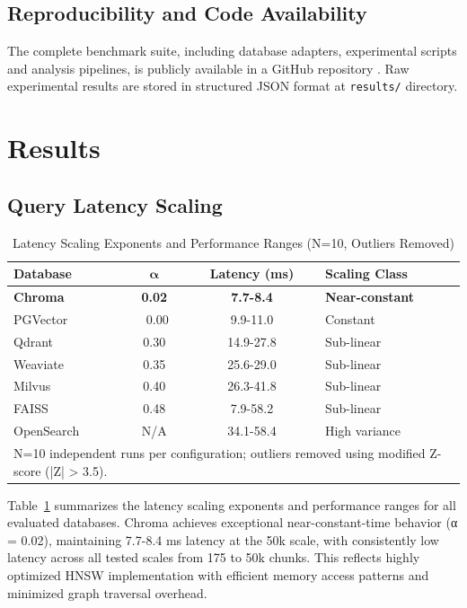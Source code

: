 \documentclass{article}
\begin{document}
\subsection{Reproducibility and Code Availability}
The complete benchmark suite, including database adapters, experimental scripts and analysis pipelines, is publicly available in a GitHub repository \cite{kwaai2025benchmark}. Raw experimental results are stored in structured JSON format at \texttt{results/} directory.


\section{Results}
\label{sec: results}

\subsection{Query Latency Scaling}
\begin{table}[h]
\small
\centering
\caption{Latency Scaling Exponents and Performance Ranges (N=10, Outliers Removed)}
\begin{tabular}{lccl}
\toprule
\textbf{Database} & $\boldsymbol{\alpha}$ & \textbf{Latency (ms)} & \textbf{Scaling Class} \\
\midrule
\textbf{Chroma} & \textbf{0.02} & \textbf{7.7-8.4} & \textbf{Near-constant} \\
PGVector & ~0.00 & 9.9-11.0 & Constant \\
Qdrant & 0.30 & 14.9-27.8 & Sub-linear \\
Weaviate & 0.35 & 25.6-29.0 & Sub-linear \\
Milvus & 0.40 & 26.3-41.8 & Sub-linear \\
FAISS & 0.48 & 7.9-58.2 & Sub-linear \\
OpenSearch & N/A & 34.1-58.4 & High variance \\
\bottomrule
\multicolumn{4}{l}{\small *N=10 independent runs per configuration; outliers removed using modified Z-score (|Z| > 3.5).}
\end{tabular}
\label{tab:latency}
\end{table}

Table~\ref{tab:latency} summarizes the latency scaling exponents and performance ranges for all evaluated databases. Chroma achieves exceptional near-constant-time behavior (α = 0.02), maintaining 7.7-8.4 ms latency at the 50k scale, with consistently low latency across all tested scales from 175 to 50k chunks. This reflects highly optimized HNSW implementation with efficient memory access patterns and minimized graph traversal overhead.
\end{document}
